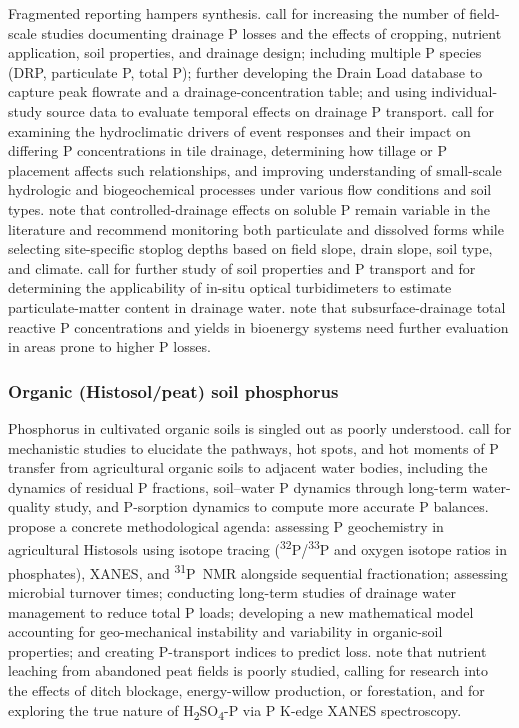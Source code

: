 \documentclass[11pt]{article}
\begin{document}
Fragmented reporting hampers synthesis. \textcite{Christianson2016} call for increasing the number of field-scale studies documenting drainage P losses and the effects of cropping, nutrient application, soil properties, and drainage design; including multiple P species (DRP, particulate P, total P); further developing the Drain Load database to capture peak flowrate and a drainage-concentration table; and using individual-study source data to evaluate temporal effects on drainage P transport. \textcite{Macrae2019} call for examining the hydroclimatic drivers of event responses and their impact on differing P concentrations in tile drainage, determining how tillage or P placement affects such relationships, and improving understanding of small-scale hydrologic and biogeochemical processes under various flow conditions and soil types. \textcite{Tanga2025} note that controlled-drainage effects on soluble P remain variable in the literature and recommend monitoring both particulate and dissolved forms while selecting site-specific stoplog depths based on field slope, drain slope, soil type, and climate. \textcite{Grant1996} call for further study of soil properties and P transport and for determining the applicability of in-situ optical turbidimeters to estimate particulate-matter content in drainage water. \textcite{Daigh2015b} note that subsurface-drainage total reactive P concentrations and yields in bioenergy systems need further evaluation in areas prone to higher P losses.

\subsubsection{Organic (Histosol/peat) soil phosphorus}

Phosphorus in cultivated organic soils is singled out as poorly understood. \textcite{Grenon2022} call for mechanistic studies to elucidate the pathways, hot spots, and hot moments of P transfer from agricultural organic soils to adjacent water bodies, including the dynamics of residual P fractions, soil--water P dynamics through long-term water-quality study, and P-sorption dynamics to compute more accurate P balances. \textcite{Grenon2021} propose a concrete methodological agenda: assessing P geochemistry in agricultural Histosols using isotope tracing (\textsuperscript{32}P/\textsuperscript{33}P and oxygen isotope ratios in phosphates), XANES, and \textsuperscript{31}P~NMR alongside sequential fractionation; assessing microbial turnover times; conducting long-term studies of drainage water management to reduce total P loads; developing a new mathematical model accounting for geo-mechanical instability and variability in organic-soil properties; and creating P-transport indices to predict loss. \textcite{Höyhtyä2025} note that nutrient leaching from abandoned peat fields is poorly studied, calling for research into the effects of ditch blockage, energy-willow production, or forestation, and for exploring the true nature of H\textsubscript{2}SO\textsubscript{4}-P via P K-edge XANES spectroscopy.
\end{document}
